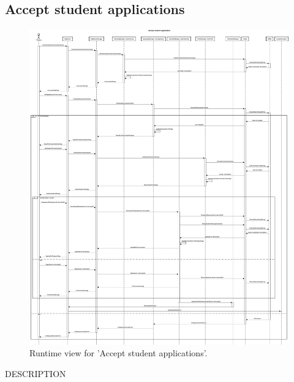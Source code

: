 \subsection{Accept student applications}
\begin{figure}[H]
    \begin{center}
        \includegraphics[width=0.8\linewidth]{DD/LaTeX/Images/RuntimeView/AcceptSTApplication.png}
        \caption{Runtime view for 'Accept student applications'.}
        \label{fig:runtime_AcceptSTApplication}%
    \end{center}
\end{figure}

DESCRIPTION


